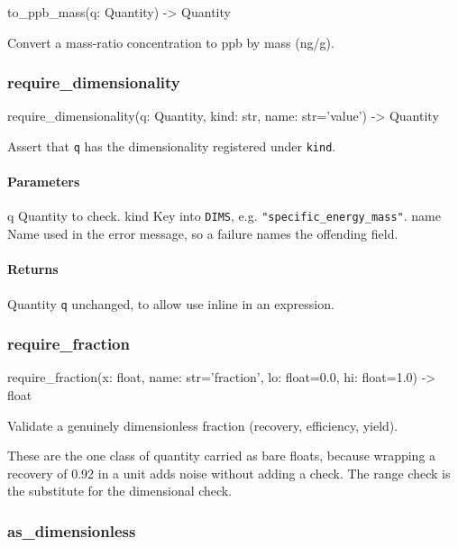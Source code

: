 \documentclass[10pt,a4paper,twoside]{report}
\begin{document}
\begin{verbatimsmall}
to_ppb_mass(q: Quantity) -> Quantity
\end{verbatimsmall}

Convert a mass-ratio concentration to ppb by mass (ng/g).

\subsubsection*{require\_dimensionality}

\begin{verbatimsmall}
require_dimensionality(q: Quantity, kind: str, name: str='value') -> Quantity
\end{verbatimsmall}

Assert that \texttt{q} has the dimensionality registered under \texttt{kind}.

\paragraph*{Parameters}

q Quantity to check. kind Key into \texttt{DIMS}, e.g. \texttt{"specific\_energy\_mass"}. name Name used in the error message, so a failure names the offending field.

\paragraph*{Returns}

Quantity \texttt{q} unchanged, to allow use inline in an expression.

\subsubsection*{require\_fraction}

\begin{verbatimsmall}
require_fraction(x: float, name: str='fraction', lo: float=0.0, hi: float=1.0) -> float
\end{verbatimsmall}

Validate a genuinely dimensionless fraction (recovery, efficiency, yield).

These are the one class of quantity carried as bare floats, because wrapping a recovery of 0.92 in a unit adds noise without adding a check. The range check is the substitute for the dimensional check.

\subsubsection*{as\_dimensionless}
\end{document}
